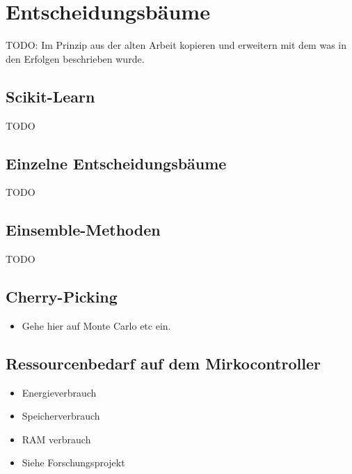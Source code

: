 \chapter{Entscheidungsbäume}
TODO: Im Prinzip aus der alten Arbeit kopieren und erweitern mit dem was in den Erfolgen beschrieben wurde.

\section{Scikit-Learn}
TODO

\section{Einzelne Entscheidungsbäume}
TODO

\section{Einsemble-Methoden}
TODO

\section{Cherry-Picking}
\begin{itemize}
    \item Gehe hier auf Monte Carlo etc ein.
\end{itemize}

\section{Ressourcenbedarf auf dem Mirkocontroller}
\begin{itemize}
    \item Energieverbrauch
    \item Speicherverbrauch
    \item RAM verbrauch
    \item Siehe Forschungsprojekt
\end{itemize}